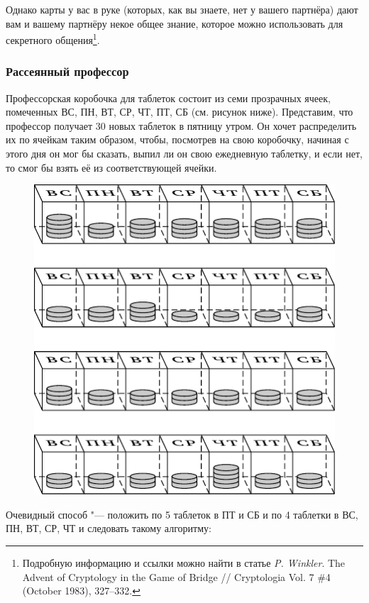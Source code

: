 \documentclass[twoside]{book}
\begin{document}
Однако карты у вас в руке (которых, как вы знаете, нет у вашего партнёра) дают вам и вашему партнёру некое общее знание, которое можно использовать для секретного общения\footnote{
Подробную информацию и ссылки можно найти в статье \emph{P. Winkler}. The Advent of Cryptology in the Game of Bridge /\!/ {Cryptologia} Vol. 7 \#4 (October 1983),  327--332.}.

\subsubsection*{Рассеянный профессор}%

Профессорская коробочка для таблеток состоит из семи прозрачных ячеек, помеченных ВС, ПН, ВТ, СР, ЧТ, ПТ, СБ (см. рисунок ниже).
Представим, что профессор получает 30 новых таблеток в пятницу утром.
Он хочет распределить их по ячейкам таким образом, чтобы, посмотрев на свою коробочку, начиная с этого дня он мог бы сказать, выпил ли он свою ежедневную таблетку, и если нет, то смог бы взять её из соответствующей ячейки.

\begin{figure}[!ht]
\centering
\includegraphics{mp/wink-25}
\end{figure}


Очевидный способ "--- положить по 5 таблеток в ПТ и СБ и по 4 таблетки в ВС, ПН, ВТ, СР, ЧТ и следовать такому алгоритму:
\end{document}
